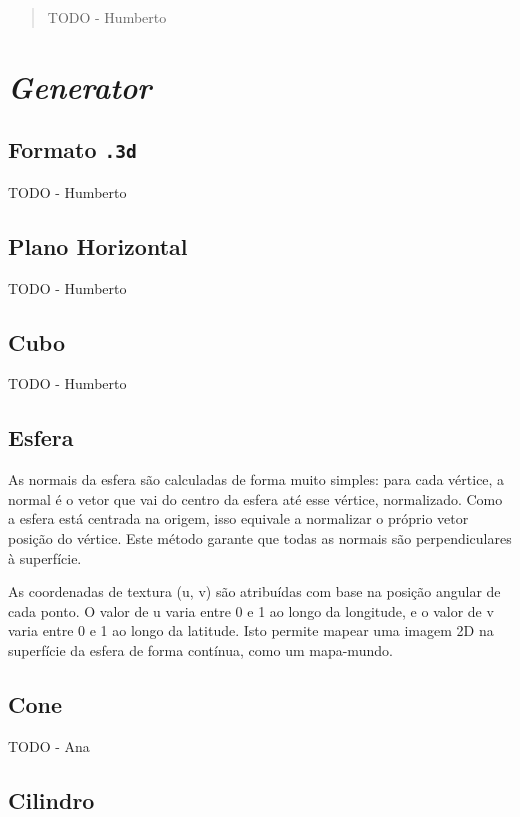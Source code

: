 \documentclass[12pt, a4paper]{article}
\begin{document}
\pagebreak

\begin{abstract}
    \noindent
    {\color{red} TODO - Humberto}
\end{abstract}

\section{\emph{Generator}}

\subsection{Formato \texttt{.3d}}

{\color{red} TODO - Humberto}

\subsection{Plano Horizontal}

{\color{red} TODO - Humberto}

\subsection{Cubo}

{\color{red} TODO - Humberto}

\subsection{Esfera}

As normais da esfera são calculadas de forma muito simples: para cada vértice, a normal é o vetor
que vai do centro da esfera até esse vértice, normalizado. Como a esfera está centrada na origem,
isso equivale a normalizar o próprio vetor posição do vértice. Este método garante que todas as
normais são perpendiculares à superfície.

As coordenadas de textura (u, v) são atribuídas com base na posição angular de cada ponto. O valor
de u varia entre 0 e 1 ao longo da longitude, e o valor de v varia entre 0 e 1 ao longo da latitude.
Isto permite mapear uma imagem 2D na superfície da esfera de forma contínua, como um mapa-mundo.

\subsection{Cone}

{\color{red} TODO - Ana}

\subsection{Cilindro}
\end{document}
